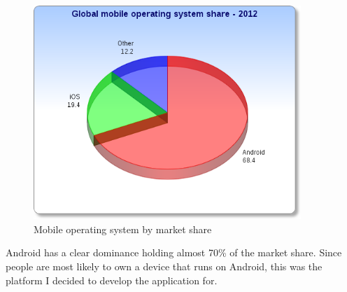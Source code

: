 \begin{figure}[!h]
\centering
\includegraphics[width=0.9\textwidth]{Images/platform.png}
\caption{Mobile operating system by market share}
\label{fig:operatingsystem_piechart}
\end{figure}

Android has a clear dominance holding almost 70\% of the market share. Since people are most likely to own a device that runs on Android, this was the platform I decided to develop the application for.